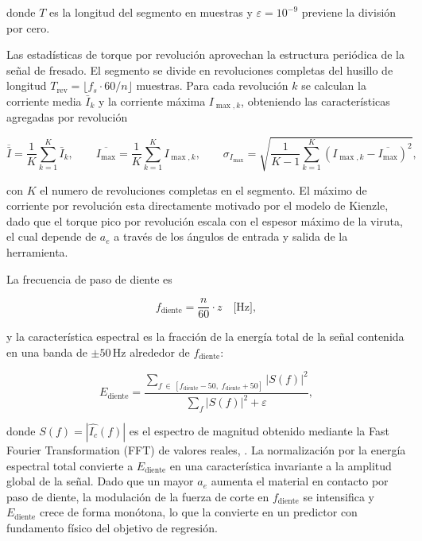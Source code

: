 \documentclass[12pt, letterpaper]{article}
\begin{document}
donde $T$ es la longitud del segmento en muestras y $\varepsilon = 10^{-9}$ previene la división por cero.

Las estadísticas de torque por revolución aprovechan la estructura periódica de la señal de fresado. El segmento se divide en revoluciones completas del husillo de longitud $T_{\text{rev}} = \lfloor f_s \cdot 60 / n \rfloor$ muestras. Para cada revolución $k$ se calculan la corriente media $\bar{I}_k$ y la corriente máxima $I_{\max,k}$, obteniendo las características agregadas por revolución

\begin{equation}
  \overline{\bar{I}} = \frac{1}{K}\sum_{k=1}^{K} \bar{I}_k, \qquad
  \overline{I_{\max}} = \frac{1}{K}\sum_{k=1}^{K} I_{\max,k}, \qquad
  \sigma_{I_{\max}} = \sqrt{\frac{1}{K-1}\sum_{k=1}^{K}\!\left(I_{\max,k} - \overline{I_{\max}}\right)^2},
  \label{eq:torque_rev}
\end{equation}

con $K$ el numero de revoluciones completas en el segmento. El máximo de corriente por revolución esta directamente motivado por el modelo de Kienzle, dado que el torque pico por revolución escala con el espesor máximo de la viruta, el cual depende de $a_e$ a través de los ángulos de entrada y salida de la herramienta.

La frecuencia de paso de diente es

\begin{equation}
  f_{\text{diente}} = \frac{n}{60} \cdot z \quad \text{[Hz]},
  \label{eq:f_diente}
\end{equation}

y la característica espectral es la fracción de la energía total de la señal contenida en una banda de $\pm 50\,\text{Hz}$ alrededor de $f_{\text{diente}}$:

\begin{equation}
  E_{\text{diente}} = \frac{\displaystyle\sum_{f \,\in\, [f_{\text{diente}}-50,\; f_{\text{diente}}+50]}|S(f)|^2}{\displaystyle\sum_{f} |S(f)|^2 + \varepsilon},
  \label{eq:E_diente}
\end{equation}

donde $S(f) = |\widehat{I_c}(f)|$ es el espectro de magnitud obtenido mediante la  Fast Fourier Transformation (FFT) de valores reales, \cite{schmitz2009}. La normalización por la energía espectral total convierte a $E_{\text{diente}}$ en una característica invariante a la amplitud global de la señal. Dado que un mayor $a_e$ aumenta el material en contacto por paso de diente, la modulación de la fuerza de corte en $f_{\text{diente}}$ se intensifica y $E_{\text{diente}}$ crece de forma monótona, lo que la convierte en un predictor con fundamento físico del objetivo de regresión.
\end{document}
